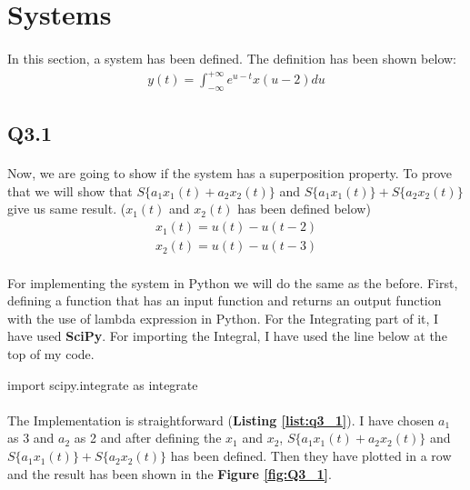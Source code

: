 \section{Systems}
\paragraph{}In this section, a system has been defined. 
The definition has been shown below:
\begin{align}
    y(t) = \int_{-\infty}^{+\infty} e^{u-t}x(u-2) du
    \label{y}
\end{align}
\subsection{Q3.1}
\paragraph{}Now, we are going to show if the system has 
a superposition property. To prove that we will show that
 $S\{a_1x_1(t)+a_2x_2(t)\}$ and $S\{a_1x_1(t)\}+
 S\{a_2x_2(t)\}$ give us same result. ($ x_1(t)$ and 
 $x_2(t)$ has been defined below)
 \begin{align}
    x_1(t) = u(t)-u(t-2) \label{x_1}\\
    x_2(t) = u(t)-u(t-3)
    \label{x_2}
\end{align}
\paragraph{}For implementing the system in Python we 
will do the same as the before. First, defining a 
function that has an input function and returns an 
output function with the use of lambda expression in 
Python. For the Integrating part of it, I have 
used \textbf{SciPy}. For importing the Integral, I 
have used the line below at the top of my code.
\begin{python}
import scipy.integrate as integrate
\end{python}
\paragraph{}The Implementation is straightforward 
(\textbf{Listing \ref{list:q3_1}}). I have chosen $a_1$ as 3 and 
$a_2$ as 2 and after defining the $x_1$ and $x_2$, 
$S\{a_1x_1(t)+a_2x_2(t)\}$ and $S\{a_1x_1(t)\}+ 
S\{a_2x_2(t)\}$ has been defined. Then they have 
plotted in a row and the result has been shown in 
the \textbf{Figure \ref{fig:Q3_1}}.

